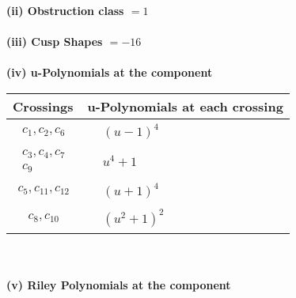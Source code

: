 \documentclass[1p]{elsarticle_modified}
\theoremstyle{definition}
\begin{document}
\flushleft \textbf{(ii) Obstruction class $= 1$}\\~\\
\flushleft \textbf{(iii) Cusp Shapes $= -16$}\\~\\
\newpage\renewcommand{\arraystretch}{1}
\flushleft \textbf{(iv) u-Polynomials at the component}\newline \\
\begin{tabular}{m{50pt}|m{274pt}}
Crossings & \hspace{64pt}u-Polynomials at each crossing \\
\hline $$\begin{aligned}c_{1},c_{2},c_{6}\end{aligned}$$&$\begin{aligned}
&(u-1)^4
\end{aligned}$\\
\hline $$\begin{aligned}c_{3},c_{4},c_{7}\\c_{9}\end{aligned}$$&$\begin{aligned}
&u^4+1
\end{aligned}$\\
\hline $$\begin{aligned}c_{5},c_{11},c_{12}\end{aligned}$$&$\begin{aligned}
&(u+1)^4
\end{aligned}$\\
\hline $$\begin{aligned}c_{8},c_{10}\end{aligned}$$&$\begin{aligned}
&(u^2+1)^2
\end{aligned}$\\
\hline
\end{tabular}\\~\\
\newpage\renewcommand{\arraystretch}{1}
\flushleft \textbf{(v) Riley Polynomials at the component}\newline \\
\end{document}
